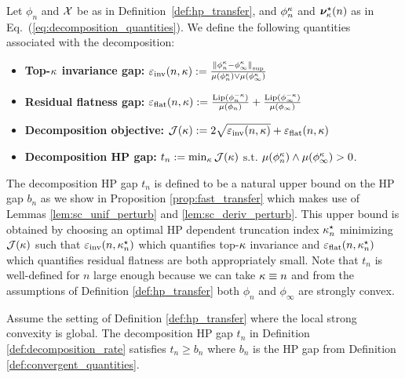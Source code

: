 \begin{definition}\label{def:decomposition_rate}
Let $\phi_n$ and $\mathcal{X}$ be as in Definition~\ref{def:hp_transfer}, and $\phi_n^\kappa$ and $\bm{\nu}^\star_\kappa(n)$ as in Eq.\ (\ref{eq:decomposition_quantities}). We define the following quantities associated with the decomposition:
\begin{itemize}
    \item \textbf{Top-$\kappa$ invariance gap:} $ \varepsilon_{\mathrm{inv}}(n, \kappa) := \frac{\norm{\phi_n^\kappa - \phi_\infty^\kappa}_{\mathrm{sup}}}{\mu(\phi_n^\kappa) \vee \mu(\phi_\infty^\kappa)}$

    \item \textbf{Residual flatness gap:} $ \varepsilon_{\mathrm{flat}}(n, \kappa) := \frac{\mathrm{Lip}(\phi_n^{-\kappa})}{\mu(\phi_n)} + \frac{\mathrm{Lip}(\phi_\infty^{-\kappa})}{\mu(\phi_\infty)}$

    \item \textbf{Decomposition objective:} $\mathcal{J}(\kappa) := 2 \sqrt{\varepsilon_{\mathrm{inv}}(n, \kappa) } + \varepsilon_{\mathrm{flat}}(n, \kappa)$
    
    \item \textbf{Decomposition HP gap:}  $ t_n := \min_{\kappa} \mathcal{J}(\kappa)$ $\mathrm{s.t.}$ $\mu(\phi_n^\kappa) \wedge \mu(\phi_\infty^\kappa) > 0$.
\end{itemize}
\end{definition}
The decomposition HP gap $t_n$ is defined to be a natural upper bound on the HP gap $b_n$ as we show in Proposition \ref{prop:fast_transfer} which makes use of Lemmas \ref{lem:sc_unif_perturb} and \ref{lem:sc_deriv_perturb}. This upper bound is obtained by choosing an optimal HP dependent truncation index $\kappa^\star_n$ minimizing $\mathcal{J}(\kappa)$ such that $\varepsilon_{\mathrm{inv}}(n, \kappa^\star_n)$ which quantifies top-$\kappa$ invariance and $\varepsilon_{\mathrm{flat}}(n, \kappa^\star_n)$ which quantifies residual flatness are both appropriately small. Note that $t_n$ is well-defined for $n$ large enough because we can take $\kappa \equiv n$ and from the assumptions of Definition \ref{def:hp_transfer} both $\phi_n$ and $\phi_\infty$ are strongly convex.
\begin{proposition}\label{prop:fast_transfer}
Assume the setting of Definition \ref{def:hp_transfer} where the local strong convexity is global. The decomposition HP gap $t_n$ in Definition \ref{def:decomposition_rate} satisfies $t_n \geq b_n$ where $b_n$ is the HP gap from Definition \ref{def:convergent_quantities}.
\end{proposition}

